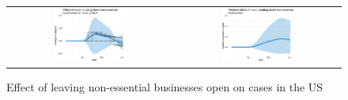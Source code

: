 \documentclass[11pt,reqno,letter]{amsart}
\theoremstyle{definition}
\begin{document}
\begin{figure}[ht]
\begin{minipage}{\linewidth}
\begin{tabular}{cc}
    \end{tabular}
  \end{minipage}
\end{figure}

\begin{figure}[ht]
  \caption{Effect  of   leaving non-essential businesses open on cases in the US  \label{fig:US-nb-dgrowth}}
  \begin{minipage}{\linewidth}
    \centering
    \begin{tabular}{cc}
      \includegraphics[width=0.45\textwidth]{tables_and_figures/us-nb-dgrowth_v1}
      &
        \includegraphics[width=0.45\textwidth]{tables_and_figures/us-nb-rel_v1}
    \end{tabular}
  \end{minipage}
\end{figure}
\end{document}
